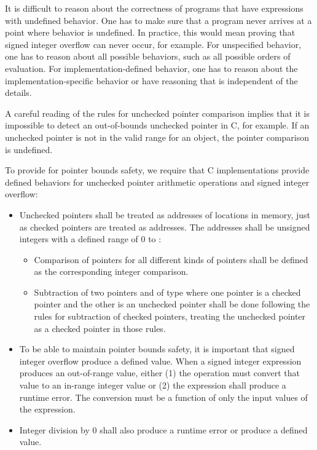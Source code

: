 It is difficult to reason about the correctness of programs that have
expressions with undefined behavior. One has to make sure that a program
never arrives at a point where behavior is undefined. In practice, this
would mean proving that signed integer overflow can never occur, for
example. For unspecified behavior, one has to reason about all possible
behaviors, such as all possible orders of evaluation. For
implementation-defined behavior, one has to reason about the
implementation-specific behavior or have reasoning that is independent
of the details.

A careful reading of the rules for unchecked pointer comparison implies
that it is impossible to detect an out-of-bounds unchecked pointer in C,
for example. If an unchecked pointer  is not in the valid range for an
object, the pointer comparison is undefined.

To provide for pointer bounds safety, we require that C implementations
provide defined behaviors for unchecked pointer arithmetic operations and
signed integer overflow:

\begin{itemize}
\item
  Unchecked pointers shall be treated as addresses of locations in memory,
  just as checked pointers are treated as addresses. The addresses shall
  be unsigned integers with a defined range of 0 to
  :

  \begin{itemize}
  \item
    Comparison of pointers for all different kinds of pointers shall be
    defined as the corresponding integer comparison.
  \item
    Subtraction  \code{-}  of two pointers  and 
    of type  where one
    pointer is a checked pointer and the other is an unchecked pointer shall
    be done following the rules for subtraction of checked pointers,
    treating the unchecked pointer as a checked pointer in those rules.
  \end{itemize}
\end{itemize}

\begin{itemize}
\item
  To be able to maintain pointer bounds safety, it is important that
  signed integer overflow produce a defined value. When a signed integer
  expression produces an out-of-range value, either (1) the operation
  must convert that value to an in-range integer value or (2) the
  expression shall produce a runtime error. The conversion must be a
  function of only the input values of the expression.
\item
  Integer division by 0 shall also produce a runtime error or produce a
  defined value.
\end{itemize}

